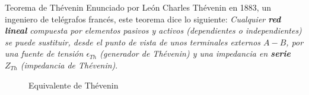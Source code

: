 \documentclass[11pt]{book} %
\makeatletter
\numberwithin{dummy}{section}
\theoremstyle{ocrenumbox}
\theoremstyle{blacknumex}
\theoremstyle{blacknumbox}
\theoremstyle{ocrenum}
\renewcommand{\subsection}{\@startsection {subsection}{2}{\z@}
{-3ex \@plus -0.1ex \@minus -.4ex}
{0.5ex \@plus.2ex }
{\normalfont\sffamily\bfseries}}
\makeatother
\begin{document}
\subsection{Teorema de Thévenin}
Enunciado por León Charles Thévenin en 1883, un ingeniero de telégrafos francés, este teorema dice lo siguiente:  \textit{Cualquier \textbf{red lineal} compuesta por elementos pasivos y activos (dependientes o independientes) se puede sustituir, desde el punto de vista de unos terminales externos $A-B$, por una fuente de tensión $\epsilon_{Th}$ (generador de Thévenin) y una impedancia en \textbf{serie} $Z_{Th}$ (impedancia de Thévenin)}.
\begin{figure}[htbp]
        \centering
        \hfil
        \caption{Equivalente de Thévenin}
        \label{fig.thevenin}
    \end{figure}
    
\end{document}
